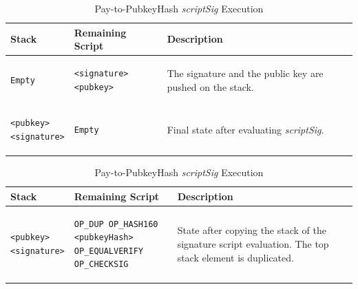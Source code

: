 \begin{table}[!ht]
  
\begin{minipage}{\textwidth}

\centering
\begin{tabular}{| m{95pt} | m{145pt} | m{100pt} |}
\hline
\textbf{Stack} & \textbf{Remaining Script} & \textbf{Description} \\ \hline \hline

\vspace{8pt}
\begin{BVerbatim}[fontsize==\relsize{-4}]
Empty
\end{BVerbatim} 
\vspace{4pt}
&
\vspace{8pt}
\begin{BVerbatim}[fontsize==\relsize{-4}]
<signature> <pubkey>
\end{BVerbatim} 
\vspace{4pt}
&
The signature and the public key are pushed on the stack. \\ \hline


\vspace{8pt}
\begin{BVerbatim}[fontsize==\relsize{-4}]
<pubkey>
<signature>
\end{BVerbatim} 
\vspace{4pt}
&
\vspace{8pt}
\begin{BVerbatim}[fontsize==\relsize{-4}]
Empty
\end{BVerbatim} 
\vspace{4pt}
&
Final state after evaluating \textit{scriptSig}. \\ \hline

\end{tabular}
\vspace{5pt}
\caption{Pay-to-PubkeyHash \textit{scriptSig} Execution}
\label{tab:P2PubHash1}

\vspace{15pt}


\centering
\begin{tabular}{| m{95pt} | m{145pt} | m{100pt} |}
\hline
\textbf{Stack} & \textbf{Remaining Script} & \textbf{Description} \\ \hline \hline

\vspace{8pt}
\begin{BVerbatim}[fontsize==\relsize{-4}]
<pubkey>
<signature>
\end{BVerbatim}
\vspace{4pt}
&
\vspace{8pt}
\begin{BVerbatim}[fontsize==\relsize{-4}]
OP_DUP OP_HASH160 <pubkeyHash>
OP_EQUALVERIFY OP_CHECKSIG
\end{BVerbatim} 
\vspace{4pt}
&
State after copying the stack of the signature script evaluation. The top stack element is duplicated.\\ \hline



\end{tabular}
\end{minipage}
\end{table}
